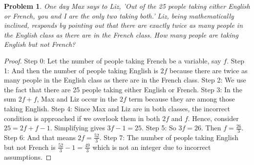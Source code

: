 \documentclass{article}
\newtheorem{theorem}{Problem}
\begin{document}
\begin{theorem}
One day Max says to Liz, 'Out of the 25 people taking either English or French, you and I are the only two taking both.' Liz, being mathematically inclined, responds by pointing out that there are exactly twice as many people in the English class as there are in the French class. How many people are taking English but not French?
\end{theorem}

\begin{proof}
Step 0: Let the number of people taking French be a variable, say $f$.
Step 1: And then the number of people taking English is $2f$ because there are twice as many people in the English class as there are in the French class.
Step 2: We use the fact that there are 25 people taking either English or French.
Step 3: In the sum $2f + f$, Max and Liz occur in the $2f$ term because they are among those taking English.
Step 4: Since Max and Liz are in both classes, the incorrect condition is approached if we overlook them in both $2f$ and $f$. Hence, consider $25 = 2f + f - 1$. Simplifying gives $3f - 1 = 25$.
Step 5: So $3f = 26$. Then $f = \frac{26}{3}$.
Step 6: And that means $2f = \frac{52}{3}$.
Step 7: The number of people taking English but not French is $\frac{52}{3} - 1 = \frac{49}{3}$ which is not an integer due to incorrect assumptions.
\end{proof}
\end{document}
